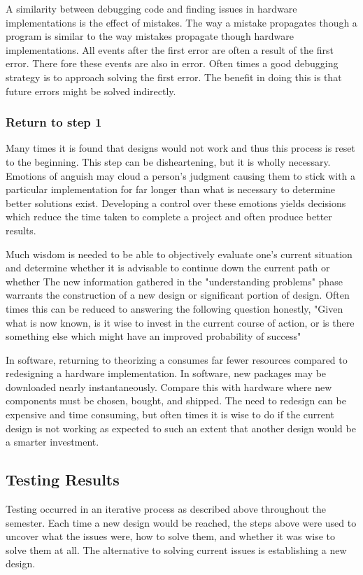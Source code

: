 \documentclass{article}	%
\begin{document}
\begin{multicols}{2}
A similarity between debugging code and
finding issues in hardware implementations is
the effect of mistakes.
The way a mistake propagates though a
program is similar to the way mistakes
propagate though hardware implementations.
All events after the first error are
often a result of the first error.
There fore these events are also in error.
Often times a good debugging strategy is
to approach solving the first error.
The benefit in doing this is that future errors
might be solved indirectly.

\subsubsection{Return to step 1}
Many times it is found that designs would not work
and thus this process is reset to the beginning.
This step can be disheartening, but
it is wholly necessary.
Emotions of anguish may cloud a person's judgment
causing them to stick with a particular implementation
for far longer than what is necessary to determine 
better solutions exist.
Developing a control over these emotions
yields decisions which reduce the time
taken to complete a project and
often produce better results.

Much wisdom is needed to be able to objectively 
evaluate one's current situation and determine 
whether it is advisable to
continue down the current path or whether
The new information gathered in the "understanding problems" phase
warrants the construction of a new design 
or significant portion of design.
Often times this can be reduced to answering the following question honestly,
"Given what is now known,
is it wise to invest in the current course of action, or
is there something else which might have an improved probability of success"

In software,
returning to theorizing a consumes far fewer resources compared
to redesigning a hardware implementation.
In software,
new packages may be downloaded nearly instantaneously.
Compare this with hardware where new components must
be chosen, bought, and shipped.
The need to redesign can be expensive and time consuming, but
often times it is wise to do if the current design is not working as expected
to such an extent that another design would be a smarter investment.

\subsection{Testing Results}
Testing occurred in an iterative process
as described above throughout the semester.
Each time a new design would be reached,
the steps above were used to uncover what
the issues were, 
how to solve them, and
whether it was wise to solve them at all.
The alternative to solving current issues is
establishing a new design.


\end{multicols}
\end{document}
